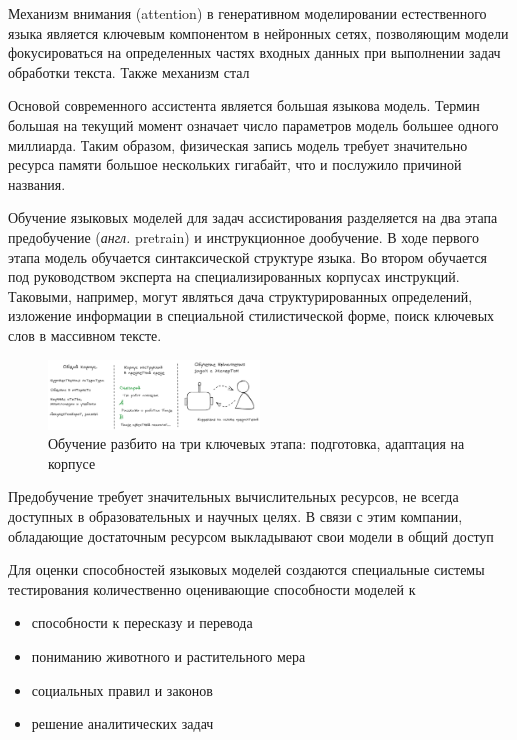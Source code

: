 Механизм внимания (attention) в генеративном моделировании естественного языка является ключевым компонентом в нейронных сетях, 
позволяющим модели фокусироваться на определенных частях входных данных при выполнении задач обработки текста. Также механизм стал



Основой современного ассистента является большая языкова модель. Термин большая на текущий момент
означает число параметров модель большее одного миллиарда. Таким образом, физическая запись модель требует
значительно ресурса памяти большое нескольких гигабайт, что и послужило причиной названия.  

Обучение языковых моделей для задач ассистирования разделяется на два этапа предобучение (\textit{англ.} pretrain) и инструкционное дообучение.
В ходе первого этапа модель обучается синтаксической структуре языка. 
Во втором обучается под руководством эксперта на специализированных корпусах инструкций. Таковыми, например, могут являться
дача структурированных определений, изложение информации в специальной стилистической форме, поиск ключевых слов в массивном тексте.

\begin{figure}[h]
    \centering
    \includegraphics[width=0.5\textwidth]{assets/work/arch/learning.excalidraw.png}
    \caption{Обучение разбито на три ключевых этапа: подготовка, адаптация на корпусе}
    \label{train}
\end{figure}

Предобучение требует значительных вычислительных ресурсов, 
не всегда доступных в образовательных и научных
целях. В связи с этим компании, обладающие достаточным
ресурсом выкладывают свои модели в общий доступ \cite{jiang2023mistral}\cite{jiang2024mixtral}\cite{touvron2023llama}

Для оценки способностей языковых моделей создаются специальные системы тестирования количественно оценивающие способности моделей к \begin{itemize}
    \item способности к пересказу и перевода
    \item пониманию животного и растительного мера
    \item социальных правил и законов 
    \item решение аналитических задач 
\end{itemize}

